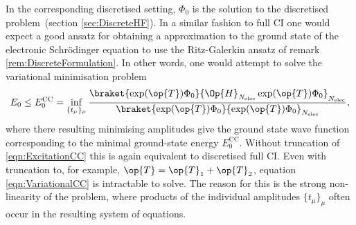 In the corresponding discretised setting,
$\Phi_0$ is the solution to the discretised
\HF problem~(section \vref{sec:DiscreteHF}).
In a similar fashion to full CI one would expect
a good ansatz for obtaining a \CC approximation to
the ground state of the electronic Schrödinger equation
to use the Ritz-Galerkin ansatz of remark \vref{rem:DiscreteFormulation}.
In other words, one would attempt to solve the variational minimisation problem
\begin{equation}
E_0 \leq E_0^\text{CC} = \inf_{\{t_\mu\}_{\mu}} \frac{\braket{\exp(\op{T}) \Phi_0}{\Op{H}_{\Nelec} \exp(\op{T}) \Phi_0}_{\Nelec}}
	{\braket{\exp(\op{T}) \Phi_0}{\exp(\op{T}) \Phi_0}_{\Nelec}},
	\label{eqn:VariationalCC}
\end{equation}
where there resulting minimising amplitudes give the \CC ground state
wave function corresponding to the minimal ground-state energy $E_0^\text{CC}$.
Without truncation of \eqref{eqn:ExcitationCC}
this is again equivalent to discretised full CI.
Even with truncation to, for example, $\op{T} = \op{T}_1 + \op{T}_2$,
equation \eqref{eqn:VariationalCC} is intractable to solve.
The reason for this is the strong non-linearity of the problem,
where products of the individual amplitudes $\{t_\mu\}_{\mu}$ often occur
in the resulting system of equations.

